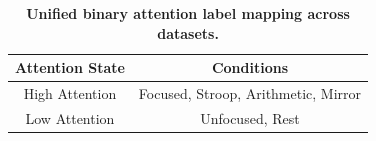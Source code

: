 \begin{table}[!ht]
\centering
\caption{\textbf{Unified binary attention label mapping across datasets.}}
\label{tab:label_mapping}
\begin{tabular}{|c|c|}
\hline
\textbf{Attention State} & \textbf{Conditions} \\
\hline
High Attention & Focused, Stroop, Arithmetic, Mirror \\
Low Attention  & Unfocused, Rest \\
\hline
\end{tabular}
\end{table}

